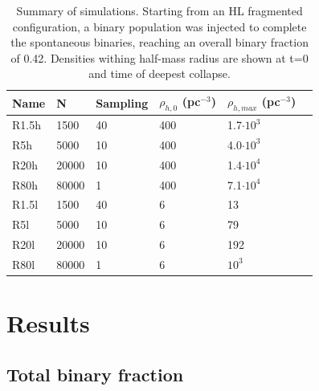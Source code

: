 \begin{table}
\begin{center}
\caption{Summary of simulations. Starting from an HL fragmented configuration, a binary population was injected to complete the spontaneous binaries, reaching an overall binary fraction of 0.42. Densities withing half-mass radius are shown at t=0 and time of deepest collapse.}
\label{Tab:6_models}
\begin{tabularx}{0.6\textwidth}{XXlXXX}
\hline
Name & N & Sampling & $\rho_{h,0}$ (pc$^{-3}$) & $\rho_{h,max}$ (pc$^{-3}$)  \\
\hline
R1.5h & 1500 & 40 & 400 & 1.7$\cdot10^3$\\
R5h  &  5000 & 10 & 400 & 4.0$\cdot10^3$\\
R20h &  20000 & 10 & 400 & 1.4$\cdot10^4$\\
R80h &  80000 & 1 & 400 & 7.1$\cdot10^4$\\
R1.5l &  1500 & 40 & 6 & 13\\
R5l &  5000 & 10 & 6 & 79 \\
R20l &  20000 & 10 & 6 & 192 \\
R80l &  80000 & 1 & 6  & $10^3$\\
\hline
\end{tabularx}
\end{center}
\end{table}


\section{Results}


\subsection{Total binary fraction}



